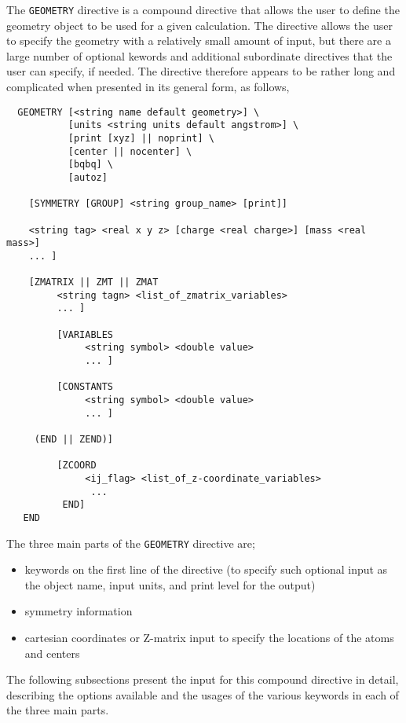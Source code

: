 \label{sec:geom}

The \verb+GEOMETRY+ directive is a compound directive that allows the
user to define the geometry object to be used for a given calculation.
The directive allows the user to specify the geometry 
with a relatively small amount of input, but there are a large number of
optional kewords and additional subordinate directives that the user can
specify, if needed.  The directive therefore appears to be rather
long and complicated when presented in its general form, as follows,
\begin{verbatim}
  GEOMETRY [<string name default geometry>] \
           [units <string units default angstrom>] \
           [print [xyz] || noprint] \
           [center || nocenter] \
           [bqbq] \
           [autoz]
    
    [SYMMETRY [GROUP] <string group_name> [print]]

    <string tag> <real x y z> [charge <real charge>] [mass <real mass>]
    ... ]

    [ZMATRIX || ZMT || ZMAT
         <string tagn> <list_of_zmatrix_variables>
         ... ]

         [VARIABLES
              <string symbol> <double value>
              ... ]
 
         [CONSTANTS
              <string symbol> <double value>
              ... ]

     (END || ZEND)]

         [ZCOORD
              <ij_flag> <list_of_z-coordinate_variables>
               ...
          END]
   END
\end{verbatim}

The three main parts of the \verb+GEOMETRY+ directive
are;

\begin{itemize}
\item keywords on the first line of the directive (to specify such optional
input as the object name, input units, and print level for the output)
\item symmetry information
\item cartesian coordinates or Z-matrix input to specify the locations 
of the atoms and centers
\end{itemize}

The following subsections present the input for this compound directive in
detail, describing the options available and the usages of the various
keywords in each of the three main parts.


